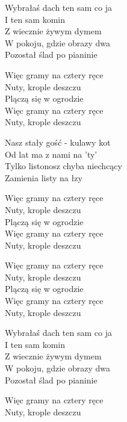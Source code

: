 
\begin{text}
    Wybrałaś dach ten sam co ja\\
    I ten sam komin\\
    Z wiecznie żywym dymem\\
    W pokoju, gdzie obrazy dwa\\
    Pozostał ślad po pianinie

    Więc gramy na cztery ręce\\
    Nuty, krople deszczu\\
    Plączą się w ogrodzie\\
    Więc gramy na cztery ręce\\
    Nuty, krople deszczu

    Nasz stały gość - kulawy kot\\
    Od lat ma z nami na 'ty'\\
    Tylko listonosz chyba niechcący\\
    Zamienia listy na łzy

    Więc gramy na cztery ręce\\
    Nuty, krople deszczu\\
    Plączą się w ogrodzie\\
    Więc gramy na cztery ręce\\
    Nuty, krople deszczu

    Więc gramy na cztery ręce\\
    Nuty, krople deszczu\\
    Plączą się w ogrodzie\\
    Więc gramy na cztery ręce\\
    Nuty, krople deszczu

    Wybrałaś dach ten sam co ja\\
    I ten sam komin\\
    Z wiecznie żywym dymem\\
    W pokoju, gdzie obrazy dwa\\
    Pozostał ślad po pianinie

    Więc gramy na cztery ręce\\
    Nuty, krople deszczu
\end{text}
\begin{chord}

\end{chord}